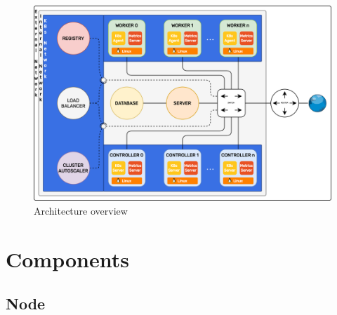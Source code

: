 \begin{figure}[htbp]
  \centering
  \includegraphics[width=.9\textwidth]{images/recluster/architecture.png}
  \caption{Architecture overview}
  \label{fig:architecture}
\end{figure}

\section{Components}
\label{sec:architecture_components}

\subsection{Node}
\label{subsec:architecture_components_node}

